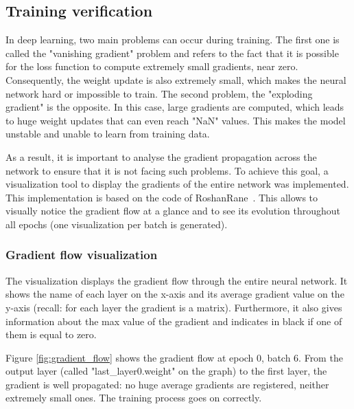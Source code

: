 \subsection{Training verification}
\setlength{\marginparwidth}{3cm}\leavevmode {}In deep learning, two main problems can occur during training. The first one is called the "vanishing gradient" problem and refers to the fact that it is possible for the loss function to compute extremely small gradients, near zero. Consequently, the weight update is also extremely small, which makes the neural network hard or impossible to train. The second problem, the "exploding gradient" is the opposite. In this case, large gradients are computed, which leads to huge weight updates that can even reach "NaN" values. This makes the model unstable and unable to learn from training data.

As a result, it is important to analyse the gradient propagation across the network to ensure that it is not facing such problems. To achieve this goal, a visualization tool to display the gradients of the entire network was implemented. This implementation is based on the code of RoshanRane~\cite{47}.  This allows to visually notice the gradient flow at a glance and to see its evolution throughout all epochs (one visualization per batch is generated).


\subsubsection{Gradient flow visualization}
The visualization displays the gradient flow through the entire neural network. It shows the name of each layer on the x-axis and its average gradient value on the y-axis (recall: for each layer the gradient is a matrix). Furthermore, it also gives information about the max value of the gradient and indicates in black if one of them is equal to zero.

Figure \ref{fig:gradient_flow} shows the gradient flow at epoch 0, batch 6. From the output layer (called "last\_layer0.weight" on the graph) to the first layer, the gradient is well propagated: no huge average gradients are registered, neither extremely small ones. The training process goes on correctly.

